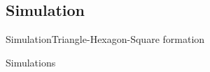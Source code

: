 \subsection{Simulation}
\begin{frame}{Simulation}{Triangle-Hexagon-Square formation}
  \begin{center}
  \end{center}
\end{frame}
\begin{frame}{Simulations}
  \begin{columns}
    \begin{column}{.45\textwidth}
       \begin{center}
       \end{center}
    \end{column}
    \begin{column}{.45\textwidth}
       \begin{center}
       \end{center}
    \end{column}
  \end{columns}
\end{frame}
